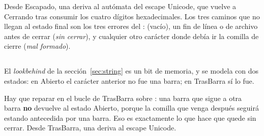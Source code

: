 \documentclass[11pt,a4paper]{article}
\begin{document}
\noindent
Desde \textsf{Escapado}, una  deriva al autómata del escape Unicode, que vuelve a
\textsf{Cerrando} tras consumir los cuatro dígitos hexadecimales. Los tres caminos que no llegan al
estado final son los tres errores del :  (vacío), un fin de línea o de
archivo antes de cerrar (\emph{sin cerrar}), y cualquier otro carácter donde debía ir la comilla de
cierre (\emph{mal formado}).

\subsection{}

El \emph{lookbehind} de la sección~\ref{sec:string} es un bit de memoria, y se modela con dos
estados: en \textsf{Abierto} el carácter anterior no fue una barra; en \textsf{TrasBarra} sí lo fue.

\begin{center}
\end{center}

\noindent
Hay que reparar en el bucle de \textsf{TrasBarra} sobre \lex{\bs}: una barra que sigue a otra barra
\textbf{no} devuelve al estado \textsf{Abierto}, porque la comilla que venga después seguirá estando
antecedida por una barra. Eso es exactamente lo que hace que  quede sin cerrar. Desde
\textsf{TrasBarra}, una  deriva al escape Unicode.

\subsection{}
\end{document}
